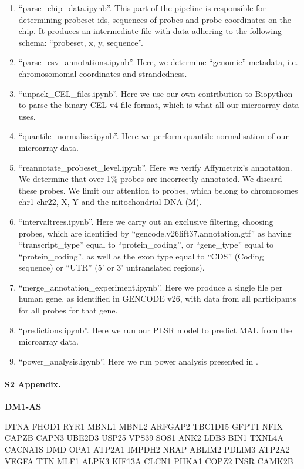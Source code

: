 \documentclass[10pt,letterpaper]{article}
\begin{document}
\begin{enumerate}

\item ``parse\_chip\_data.ipynb''. This part of the pipeline is responsible for determining probeset ids, sequences of probes and probe coordinates on the chip. It produces an intermediate file with data adhering to the following schema: ``probeset, x, y, sequence''.
\item ``parse\_csv\_annotations.ipynb''. Here, we determine ``genomic'' metadata, i.e. chromosomomal coordinates and strandedness.
\item ``unpack\_CEL\_files.ipynb''. Here we use our own contribution to Biopython to parse the binary CEL v4 file format, which is what all our microarray data uses.
\item ``quantile\_normalise.ipynb''. Here we perform quantile normalisation of our microarray data.
\item ``reannotate\_probeset\_level.ipynb''. Here we verify Affymetrix's annotation. We determine that over 1\% probes are incorrectly annotated. We discard these probes. We limit our attention to probes, which belong to chromosomes chr1-chr22, X, Y and the mitochondrial DNA (M).
\item ``intervaltrees.ipynb''. Here we carry out an exclusive filtering, choosing probes, which are identified by ``gencode.v26lift37.annotation.gtf'' as having ``transcript\_type'' equal to ``protein\_coding'',  or ``gene\_type'' equal to  ``protein\_coding'', as well as the exon type equal to ``CDS'' (Coding sequence) or ``UTR'' (5' or 3' untranslated regions).
\item ``merge\_annotation\_experiment.ipynb''. Here we produce a single file per human gene, as identified in GENCODE v26, with data from all participants for all probes for that gene.
\item ``predictions.ipynb''. Here we run our PLSR model to predict MAL from the microarray data.
\item ``power\_analysis.ipynb''. Here we run power analysis presented in .

\end{enumerate}

\paragraph*{S2 Appendix.}
\label{Appendix3}
{\bf DM1-AS}

DTNA FHOD1 RYR1 MBNL1 MBNL2 ARFGAP2 TBC1D15 GFPT1 NFIX CAPZB CAPN3 UBE2D3 USP25 VPS39 SOS1 ANK2 LDB3 BIN1 TXNL4A CACNA1S DMD OPA1 ATP2A1 IMPDH2 NRAP ABLIM2 PDLIM3 ATP2A2 VEGFA TTN MLF1 ALPK3 KIF13A CLCN1 PHKA1 COPZ2 INSR CAMK2B
\end{document}
